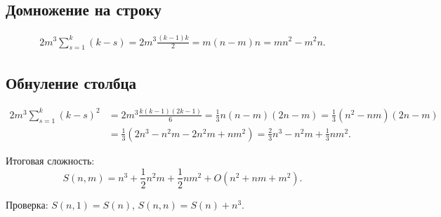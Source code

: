\documentclass[a4paper,12pt]{article}
\begin{document}
\subsection{Домножение на строку}
\begin{align*}
2m^3\sum_{s=1}^{k}{(k-s)} = 2m^3\frac{(k-1)k}{2} = m(n-m)n = mn^2-m^2n.
\end{align*}

\subsection{Обнуление столбца}
\begin{align*}
2m^3\sum_{s=1}^{k}{(k-s)^2} &= 2m^3\frac{k(k-1)(2k-1)}{6} = \frac{1}{3}n(n-m)(2n-m) = \frac{1}{3}(n^2-nm)(2n-m) \\
&= \frac{1}{3}(2n^3-n^2m-2n^2m+nm^2) = \frac{2}{3}n^3-n^2m+\frac{1}{3}nm^2.
\end{align*}

Итоговая сложность:
$$
S(n,m) = n^3+\frac{1}{2}n^2m+\frac{1}{2}nm^2+O(n^2+nm+m^2).
$$

Проверка: $S(n,1) = S(n)$, $S(n,n) = S(n)+n^3$.
\end{document}
